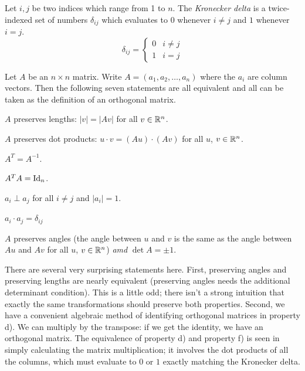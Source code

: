 \documentclass[fleqn]{report}
\begin{document}
\begin{defn}
Let $i,j$ be two indices which range from 1 to $n$. The
\emph{Kronecker delta} is a twice-indexed set of numbers
$\delta_{ij}$ which evaluates to $0$ whenever $i \neq j$ and
$1$ whenever $i=j$. 
\begin{equation*}
\delta_{ij} = \left\{ \begin{matrix} 
0 & i \neq j \\ 1 & i = j \end{matrix} \right.
\end{equation*}
\end{defn} 

\begin{prop}
Let $A$ be an $n \times n$ matrix. Write $A = (a_1, a_2,
\ldots, a_n)$ where the $a_i$ are column vectors. Then the
following seven statements are all equivalent and all can be
taken as the definition of an orthogonal matrix.
\begin{smallparts}
\item $A$ preserves lengths: $|v| = |Av|$ for all $v
\in \mathbb{R}^n$.
\item $A$ preserves dot products: $u\cdot v = (Au)
\cdot (Av)$ for all $u$, $v \in \mathbb{R}^n$.
\item $A^T = A^{-1}$.
\item $A^TA = \mathrm{Id}_n$.
\item $a_i \perp a_j$ for all $i \neq j$ and $|a_i| = 1$.
\item $a_i \cdot a_j = \delta_{ij}$
\item $A$ preserves angles (the angle between $u$ and
$v$ is the same as the angle between $Au$ and $Av$ for all
$u$, $v \in \mathbb{R}^n$) \emph{amd} $\det A = \pm 1$.
\end{smallparts}
\end{prop}

There are several very surprising statements
here. First, preserving angles and preserving lengths 
are nearly equivalent (preserving angles needs the additional
determinant condition). This is a little odd; there
isn't a strong intuition that exactly the same transformations
should preserve both properties. Second, we have a 
convenient algebraic method of identifying orthogonal
matrices in property d). We can multiply by the transpose: if we get the
identity, we have an orthogonal matrix. The equivalence of
property d) and property f) is seen in simply calculating the
matrix multiplication; it involves the dot products of all the
columns, which must evaluate to $0$ or $1$ exactly matching
the Kronecker delta. 
\end{document}
